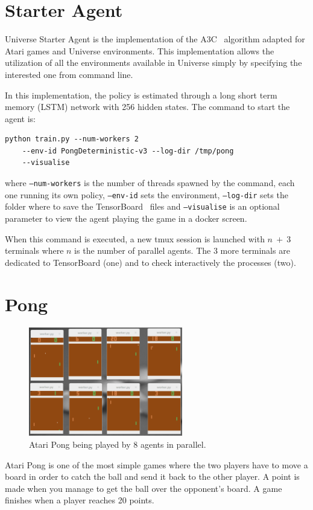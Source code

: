 \section{Starter Agent}
Universe Starter Agent is the implementation of the A3C~\cite{a3c} algorithm adapted for Atari games and Universe environments. This implementation allows the utilization of all the environments available in Universe simply by specifying the interested one from command line.

In this implementation, the policy is estimated through a long short term memory (LSTM) network with 256 hidden states.
\newline
\newline
\noindent
The command to start the agent is:
\begin{lstlisting}[frame=single]
python train.py --num-workers 2
    --env-id PongDeterministic-v3 --log-dir /tmp/pong
    --visualise
\end{lstlisting}
where \texttt{--num-workers} is the number of threads spawned by the command, each one running its own policy, \texttt{--env-id} sets the environment, \texttt{--log-dir} sets the folder where to save the TensorBoard~\cite{tensorflow} files and \texttt{--visualise} is an optional parameter to view the agent playing the game in a docker screen.

When this command is executed, a new tmux session is launched with $n~+~3$ terminals where $n$ is the number of parallel agents. The 3 more terminals are dedicated to TensorBoard (one) and to check interactively the processes (two).

\section{Pong}
\begin{figure}
    \centering
    \includegraphics[width=0.6\textwidth]{./pictures/pong.eps}
    \caption{Atari Pong being played by 8 agents in parallel.}
    \label{fig:pong}
\end{figure}
Atari Pong is one of the most simple games where the two players have to move a board in order to catch the ball and send it back to the other player. A point is made when you manage to get the ball over the opponent's board. A game finishes when a player reaches 20 points.

